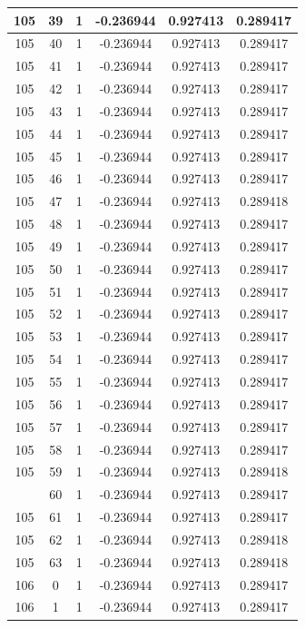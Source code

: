 \documentclass[12pt,a4paper]{article}
\numberwithin{equation}{section}
\numberwithin{figure}{section}
\numberwithin{table}{section}
\begin{document}
\begin{longtable}{|c|c|c|c|c|c|}
105 & 39 & 1 & -0.236944 & 0.927413 & 0.289417 \\ \hline
105 & 40 & 1 & -0.236944 & 0.927413 & 0.289417 \\ \hline
105 & 41 & 1 & -0.236944 & 0.927413 & 0.289417 \\ \hline
105 & 42 & 1 & -0.236944 & 0.927413 & 0.289417 \\ \hline
105 & 43 & 1 & -0.236944 & 0.927413 & 0.289417 \\ \hline
105 & 44 & 1 & -0.236944 & 0.927413 & 0.289417 \\ \hline
105 & 45 & 1 & -0.236944 & 0.927413 & 0.289417 \\ \hline
105 & 46 & 1 & -0.236944 & 0.927413 & 0.289417 \\ \hline
105 & 47 & 1 & -0.236944 & 0.927413 & 0.289418 \\ \hline
105 & 48 & 1 & -0.236944 & 0.927413 & 0.289417 \\ \hline
105 & 49 & 1 & -0.236944 & 0.927413 & 0.289417 \\ \hline
105 & 50 & 1 & -0.236944 & 0.927413 & 0.289417 \\ \hline
105 & 51 & 1 & -0.236944 & 0.927413 & 0.289417 \\ \hline
105 & 52 & 1 & -0.236944 & 0.927413 & 0.289417 \\ \hline
105 & 53 & 1 & -0.236944 & 0.927413 & 0.289417 \\ \hline
105 & 54 & 1 & -0.236944 & 0.927413 & 0.289417 \\ \hline
105 & 55 & 1 & -0.236944 & 0.927413 & 0.289417 \\ \hline
105 & 56 & 1 & -0.236944 & 0.927413 & 0.289417 \\ \hline
105 & 57 & 1 & -0.236944 & 0.927413 & 0.289417 \\ \hline
105 & 58 & 1 & -0.236944 & 0.927413 & 0.289417 \\ \hline
105 & 59 & 1 & -0.236944 & 0.927413 & 0.289418 \\ \hline
\pagebreak
105 & 60 & 1 & -0.236944 & 0.927413 & 0.289417 \\ \hline
105 & 61 & 1 & -0.236944 & 0.927413 & 0.289417 \\ \hline
105 & 62 & 1 & -0.236944 & 0.927413 & 0.289418 \\ \hline
105 & 63 & 1 & -0.236944 & 0.927413 & 0.289418 \\ \hline
106 & 0 & 1 & -0.236944 & 0.927413 & 0.289417 \\ \hline
106 & 1 & 1 & -0.236944 & 0.927413 & 0.289417 \\ \hline

\end{longtable}
\end{document}
